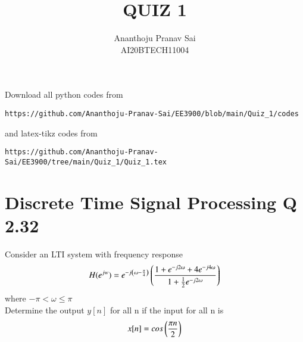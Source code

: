\documentclass[journal,12pt,twocolumn]{IEEEtran}
\begin{document}
     \def\centbox#1{\makebox[0in]{#1}}
     \def\topbox#1{\raisebox{-\baselineskip}[0in][0in]{#1}}
     \def\midbox#1{\raisebox{-0.5\baselineskip}[0in][0in]{#1}}
\vspace{3cm}
\title{QUIZ 1}
\author{Ananthoju Pranav Sai \\ AI20BTECH11004}
\maketitle
\newpage
\bigskip
\renewcommand{\thefigure}{\theenumi}
\renewcommand{\thetable}{\theenumi}
Download all python codes from 
\begin{lstlisting}
https://github.com/Ananthoju-Pranav-Sai/EE3900/blob/main/Quiz_1/codes
\end{lstlisting}
%
and latex-tikz codes from 
%
\begin{lstlisting}
https://github.com/Ananthoju-Pranav-Sai/EE3900/tree/main/Quiz_1/Quiz_1.tex
\end{lstlisting}
%
\section{Discrete Time Signal Processing Q 2.32}
Consider an LTI system with frequency response 
\begin{align}
    H(e^{jw}) = e^{-j\left(\omega-\frac{\pi}{4}\right)}\left(\frac{1+e^{-j2\omega}+4e^{-j4\omega}}{1+\frac{1}{2}e^{-j2\omega}}\right)
\end{align}
where $-\pi<\omega\leq\pi$\\
Determine the output $y[n]$ for all n if the input for all n is 
\begin{align}
    x[n] = cos\left(\frac{\pi n}{2}\right)
\end{align}
\end{document}
